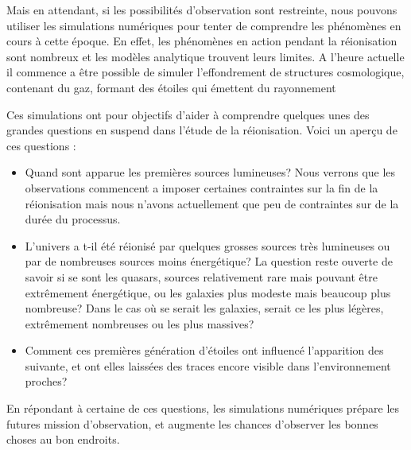 Mais en attendant, si les possibilités d'observation sont restreinte, nous pouvons utiliser les simulations numériques pour tenter de comprendre les phénomènes en cours à cette époque.
En effet, les phénomènes en action pendant la réionisation sont nombreux et les modèles analytique trouvent leurs limites.
A l'heure actuelle il commence a être possible de simuler l'effondrement de structures cosmologique, contenant du gaz, formant des étoiles qui émettent du rayonnement 

Ces simulations ont pour objectifs d'aider à comprendre quelques unes des grandes questions en suspend dans l'étude de la réionisation.
Voici un aperçu de ces questions : 

\begin{itemize}
\item Quand sont apparue les premières sources lumineuses?
Nous verrons que les observations commencent a imposer certaines contraintes sur la fin de la réionisation mais  nous n'avons actuellement que peu de contraintes sur de la durée du processus.

\item L'univers a t-il été réionisé par quelques grosses sources très lumineuses ou par de nombreuses sources moins énergétique?
La question reste ouverte de savoir si se sont les quasars, sources relativement rare mais pouvant être extrêmement énergétique, ou les galaxies plus modeste mais beaucoup plus nombreuse?
Dans le cas où se serait les galaxies, serait ce les plus légères, extrêmement nombreuses ou les plus massives?

\item Comment ces premières génération d'étoiles ont influencé l'apparition des suivante, et ont elles laissées des traces encore visible dans l'environnement proches?

\end{itemize} 

En répondant à certaine de ces questions, les simulations numériques prépare les futures mission d'observation, et augmente les chances d'observer les bonnes choses au bon endroits.





